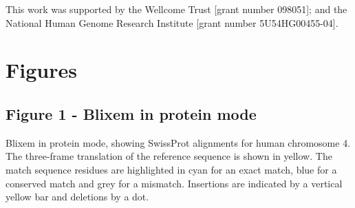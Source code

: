 \documentclass[10pt]{bmc_article}
\newenvironment{bmcformat}{\begin{raggedright}\baselineskip20pt\sloppy\setboolean{publ}{false}}{\end{raggedright}\baselineskip20pt\sloppy}
\begin{document}
\begin{bmcformat}
This work was supported by the Wellcome Trust [grant number 098051]; and the National Human Genome Research Institute [grant number 5U54HG00455-04].

 


{
   }     %





\section*{Figures}
\subsection*{Figure 1 - Blixem in protein mode}
Blixem in protein mode, showing SwissProt alignments for human chromosome 4. The three-frame translation of the reference sequence is shown in yellow. The match sequence residues are highlighted in cyan for an exact match, blue for a conserved match and grey for a mismatch. Insertions are indicated by a vertical yellow bar and deletions by a dot.


\end{bmcformat}
\end{document}
